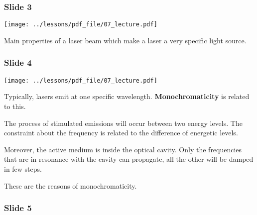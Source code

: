 \documentclass[../main/main.tex]{subfiles}
\begin{document}
\subsubsection*{Slide 3}

\begin{minipage}[]{0.5\linewidth}
\centering
\texttt{[image: ../lessons/pdf\_file/07\_lecture.pdf]}
\end{minipage}
\hspace{0.3cm}\vspace{0.3cm}
\begin{minipage}[c]{0.47\linewidth}

Main properties of a laser beam which make a laser a very specific light source.

\end{minipage}

\newpage

\subsubsection*{Slide 4}

\begin{minipage}[]{0.5\linewidth}
\centering
\texttt{[image: ../lessons/pdf\_file/07\_lecture.pdf]}
\end{minipage}
\hspace{0.3cm}\vspace{0.3cm}
\begin{minipage}[c]{0.47\linewidth}

Typically, lasers emit at one specific wavelength. \textbf{Monochromaticity} is related to this.

The process of stimulated emissions will occur between two energy levels. The constraint about the frequency is related to the difference of energetic levels.

Moreover, the active medium is inside the optical cavity. Only the frequencies that are in resonance with the cavity can propagate, all the other will be damped in few steps.

These are the reasons of monochromaticity.

\end{minipage}

\subsubsection*{Slide 5}
\end{document}
